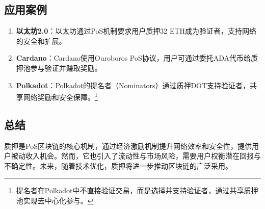 \documentclass[12pt]{ctexart}
\begin{document}
\subsection{应用案例}
\begin{enumerate}
\item \textbf{以太坊2.0}：以太坊通过PoS机制要求用户质押32 ETH成为验证者，支持网络的安全和扩展。
\item \textbf{Cardano}：Cardano使用Ouroboros PoS协议，用户可通过委托ADA代币给质押池参与验证并赚取奖励。
\item \textbf{Polkadot}：Polkadot的提名者（Nominators）通过质押DOT支持验证者，共享网络奖励和安全保障。\footnote{提名者在Polkadot中不直接验证交易，而是选择并支持验证者，通过共享质押池实现去中心化参与。}
\end{enumerate}
\subsection{总结}
质押是PoS区块链的核心机制，通过经济激励机制提升网络效率和安全性，提供用户被动收入机会。然而，它也引入了流动性与市场风险，需要用户权衡潜在回报与不确定性。未来，随着技术优化，质押将进一步推动区块链的广泛采用。
\end{document}
